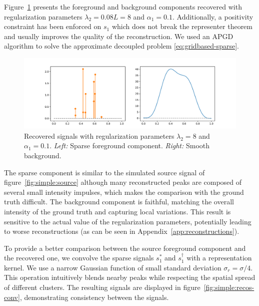 \documentclass[12pt]{article}
\begin{document}
        Figure~\ref{fig:simple:recos} presents the foreground and background components recovered with regularization parameters $\lambda_2 = 0.08 L =8$ and $\alpha_1 = 0.1$. Additionally, a positivity constraint has been enforced on $s_1$ which does not break the representer theorem and usually improves the quality of the reconstruction. We used an APGD algorithm \cite{liang2022improving} to solve the approximate decoupled problem \eqref{eq:gridbased-sparse}.

        \begin{figure}[t]
            \centering
            \includegraphics[width=\linewidth]{figures/simple_reco/recos.pdf}
            \caption{Recovered signals with regularization parameters $\lambda_2 = 8$ and $\alpha_1 = 0.1$. \textit{Left:} Sparse foreground component. \textit{Right:} Smooth background.}
            \label{fig:simple:recos}
        \end{figure}

        The sparse component is similar to the simulated source signal of figure~\ref{fig:simple:source} although many reconstructed peaks are composed of several small intensity impulses, which makes the comparison with the ground truth difficult. The background component is faithful, matching the overall intensity of the ground truth and capturing local variations. 
        This result is sensitive to the actual value of the regularization parameters, potentially leading to worse reconstructions (as can be seen in Appendix~\ref{app:reconstructions}).

        To provide a better comparison between the source foreground component and the recovered one, we convolve the sparse signals $s_1^*$ and $s_1^\dagger$ with a representation kernel. We use a narrow Gaussian function of small standard deviation $\sigma_r = \sigma/4$. This operation intuitively blends nearby peaks while respecting the spatial spread of different clusters. The resulting signals are displayed in figure~\ref{fig:simple:recos-conv}, demonstrating consistency between the signals.
        
\end{document}
